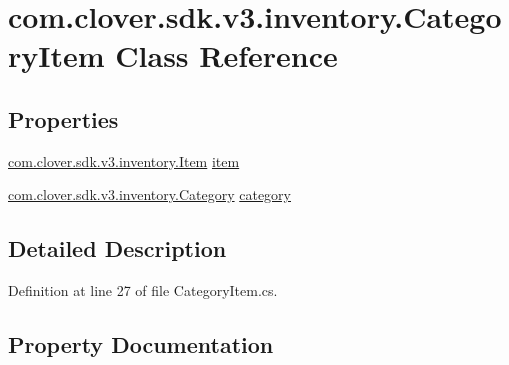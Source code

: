 \hypertarget{classcom_1_1clover_1_1sdk_1_1v3_1_1inventory_1_1_category_item}{}\section{com.\+clover.\+sdk.\+v3.\+inventory.\+Category\+Item Class Reference}
\label{classcom_1_1clover_1_1sdk_1_1v3_1_1inventory_1_1_category_item}
\subsection*{Properties}
\begin{DoxyCompactItemize}
\item 
\hyperlink{classcom_1_1clover_1_1sdk_1_1v3_1_1inventory_1_1_item}{com.\+clover.\+sdk.\+v3.\+inventory.\+Item} \hyperlink{classcom_1_1clover_1_1sdk_1_1v3_1_1inventory_1_1_category_item_aebd9e1e579acd93f92ef14a52da5cd82}{item}
\item 
\hyperlink{classcom_1_1clover_1_1sdk_1_1v3_1_1inventory_1_1_category}{com.\+clover.\+sdk.\+v3.\+inventory.\+Category} \hyperlink{classcom_1_1clover_1_1sdk_1_1v3_1_1inventory_1_1_category_item_abb4af350e8e93b69611c70db4bbba0aa}{category}
\end{DoxyCompactItemize}


\subsection{Detailed Description}


Definition at line 27 of file Category\+Item.\+cs.



\subsection{Property Documentation}
\mbox{\label{classcom_1_1clover_1_1sdk_1_1v3_1_1inventory_1_1_category_item_abb4af350e8e93b69611c70db4bbba0aa}} 
